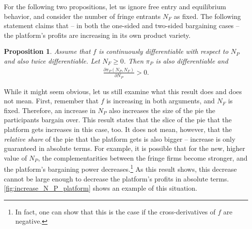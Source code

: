 \documentclass[a4paper]{article}
\newtheorem{proposition}{Proposition}
\begin{document}
For the following two propositions, let us ignore free entry and equilibrium behavior, and consider the number of fringe entrants $N_F$ as fixed.
The following statement claims that -- in both the one-sided and two-sided bargaining cases -- the platform's profits are increasing in its own product variety.
\begin{proposition}
    \label{prop:share_of_platform}
    Assume that $f$ is continuously differentiable with respect to $N_P$ and also twice differentiable.
    Let $N_F \geq 0$.
    Then $\pi_P$ is also differentiable and
    \begin{align*}
        \frac{\partial \pi_P(N_P, N_F)}{\partial N_P} > 0.
    \end{align*}
\end{proposition}
While it might seem obvious, let us still examine what this result does and does not mean.
First, remember that $f$ is increasing in both arguments, and $N_F$ is fixed.
Therefore, an increase in $N_P$ also increases the size of the pie the participants bargain over.
This result states that the slice of the pie that the platform gets increases in this case, too.
It does not mean, however, that the \emph{relative share} of the pie that the platform gets is also bigger -- increase is only guaranteed in absolute terms.
For example, it is possible that for the new, higher value of $N_P$, the complementarities between the fringe firms become stronger, and the platform's bargaining power decreases.\footnote{
    In fact, one can show that this is the case if the cross-derivatives of $f$ are negative.
}
As this result shows, this decrease cannot be large enough to decrease the platform's profits in absolute terms.
\cref{fig:increase_N_P_platform} shows an example of this situation.
\end{document}
